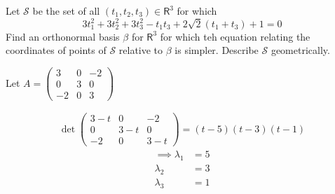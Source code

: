 Let $\mathcal{S}$ be the set of all $(t_1,t_2,t_3) \in \mathsf{R}^3$ for which
\[
3t_1^2 + 3t_2^2 +3t_3^2 -t_1t_3 +2\sqrt{2}(t_1+t_3) +1 = 0
\]
Find an orthonormal basis $\beta$ for $\mathsf{R}^3$ for which teh
equation relating the coordinates of points of $\mathcal{S}$ relative
to $\beta$ is simpler. Describe $\mathcal{S}$ geometrically.

Let $A = \begin{pmatrix}
3 & 0 & -2\\
0 & 3 & 0\\
-2 & 0 & 3
\end{pmatrix}$

\begin{gather}
\det{\begin{pmatrix}
3 -t& 0 & -2\\
0 & 3 -t& 0\\
-2 & 0 & 3-t
\end{pmatrix}}= (t-5)(t-3)(t-1)
\end{gather}
\begin{align}
\implies \lambda_1 &= 5\\
\lambda_2 &= 3\\
\lambda_3 &= 1
\end{align}
